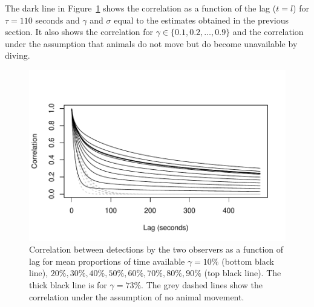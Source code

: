 \documentclass[useAMS, usenatbib, referee]{biom}\usepackage[]{graphicx}\usepackage[]{color}
\makeatletter
\def\maxwidth{ %
  \ifdim\Gin@nat@width>\linewidth
    \linewidth
  \else
    \Gin@nat@width
  \fi
}
\newenvironment{knitrout}{}{} %
\makeatother
\begin{document}


The dark line in Figure~\ref{fig:fig_correlation_plot} shows the correlation as a function of the lag ($t=l$) for $\tau=110$ seconds and $\gamma$ and $\sigma$ equal to the estimates obtained in the previous section. It also shows the correlation for $\gamma\in\{0.1, 0.2,\ldots,0.9\}$ and the correlation under the assumption that animals do not move but do become unavailable by diving.

\begin{knitrout}
\color{fgcolor}\begin{figure}

{\centering \includegraphics[width=\maxwidth]{figs/fig_correlation_plot-1} 

}

\caption[Correlation between detections by the two observers as a function of lag for mean proportions of time available \(\gamma=10\%\) (bottom black line), \(20\%, 30\%, 40\%, 50\%, 60\%, 70\%, 80\%, 90\%\) (top black line)]{Correlation between detections by the two observers as a function of lag for mean proportions of time available \(\gamma=10\%\) (bottom black line), \(20\%, 30\%, 40\%, 50\%, 60\%, 70\%, 80\%, 90\%\) (top black line). The thick black line is for \(\gamma=73\%\). The grey dashed lines show the correlation under the assumption of no animal movement.}\label{fig:fig_correlation_plot}
\end{figure}


\end{knitrout}
\end{document}
